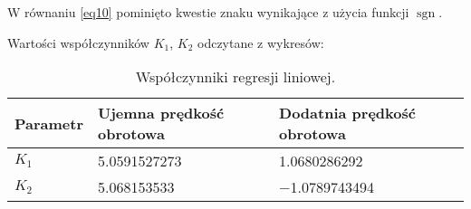 \documentclass[10pt,a4paper,onecolumn]{article}
\DeclareMathOperator{\sgn}{sgn}
\begin{document}
W równaniu \ref{eq10} pominięto kwestie znaku wynikające z użycia funkcji $\sgn$.

Wartości współczynników $K_1$, $K_2$ odczytane z wykresów:

\begin{table}[h]
    \centering
        \caption{Współczynniki regresji liniowej.}
        \label{tab:wsp_regr_lin}
        
        \begin{tabularx}{1\textwidth}{l | l | l}
            \toprule
            Parametr & Ujemna prędkość obrotowa & Dodatnia prędkość obrotowa \\
            \midrule
            $K_1$ & \num{5,0591527273} & \num{1,0680286292} \\
            $K_2$ & \num{5,068153533} & \num{-1,0789743494} \\
            \bottomrule
        \end{tabularx}
\end{table}
\end{document}
